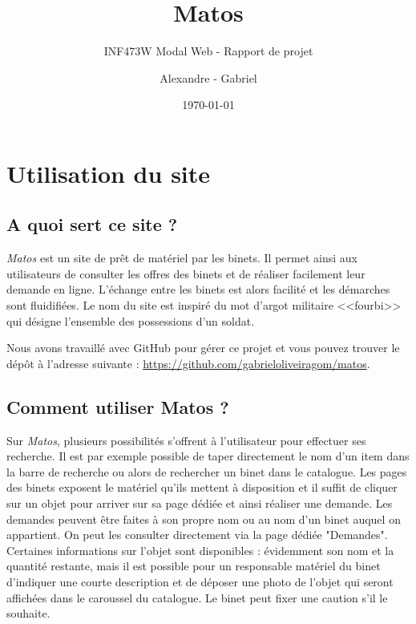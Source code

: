 \documentclass[titlepage,11pt,a4paper]{article}
\title{Matos}
\subtitle{INF473W Modal Web - Rapport de projet}
\author{Alexandre \bsc{Binninger} - Gabriel \bsc{Oliveira Martins}}
\date{\today}
\begin{document}
\maketitle

\clearpage

\setcounter{page}{1}


\section{Utilisation du site}

\subsection{A quoi sert ce site ?}

\emph{Matos} est un site de prêt de matériel par les binets. Il permet ainsi aux utilisateurs de consulter les offres des binets et de réaliser facilement leur demande en ligne. L'échange entre les binets est alors facilité et les démarches sont fluidifiées. Le nom du site est inspiré du mot d'argot militaire <<fourbi>> qui désigne l'ensemble des possessions d'un soldat.

Nous avons travaillé avec GitHub pour gérer ce projet et vous pouvez trouver le dépôt à l'adresse suivante : \url{https://github.com/gabrieloliveiragom/matos}. 


\subsection{Comment utiliser Matos ?}

Sur \emph{Matos}, plusieurs possibilités s'offrent à l'utilisateur pour effectuer ses recherche. Il est par exemple possible de taper directement le nom d'un item dans la barre de recherche ou alors de rechercher un binet dans le catalogue. Les pages des binets exposent le matériel qu'ils mettent à disposition et il suffit de cliquer sur un objet pour arriver sur sa page dédiée et ainsi réaliser une demande. Les demandes peuvent être faites à son propre nom ou au nom d'un binet auquel on appartient. On peut les consulter directement via la page dédiée "Demandes".\\

Certaines informations sur l'objet sont disponibles : évidemment son nom et la quantité restante, mais il est possible pour un responsable matériel du binet d'indiquer une courte description et de déposer une photo de l'objet qui seront affichées dans le caroussel du catalogue. Le binet peut fixer une caution s'il le souhaite.\\
\end{document}
